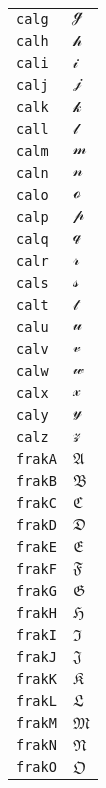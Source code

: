 \begin{longtable}{ll}
\texttt{calg}&${}\mathcal{g}{}$\\
\texttt{calh}&${}\mathcal{h}{}$\\
\texttt{cali}&${}\mathcal{i}{}$\\
\texttt{calj}&${}\mathcal{j}{}$\\
\texttt{calk}&${}\mathcal{k}{}$\\
\texttt{call}&${}\mathcal{l}{}$\\
\texttt{calm}&${}\mathcal{m}{}$\\
\texttt{caln}&${}\mathcal{n}{}$\\
\texttt{calo}&${}\mathcal{o}{}$\\
\texttt{calp}&${}\mathcal{p}{}$\\
\texttt{calq}&${}\mathcal{q}{}$\\
\texttt{calr}&${}\mathcal{r}{}$\\
\texttt{cals}&${}\mathcal{s}{}$\\
\texttt{calt}&${}\mathcal{t}{}$\\
\texttt{calu}&${}\mathcal{u}{}$\\
\texttt{calv}&${}\mathcal{v}{}$\\
\texttt{calw}&${}\mathcal{w}{}$\\
\texttt{calx}&${}\mathcal{x}{}$\\
\texttt{caly}&${}\mathcal{y}{}$\\
\texttt{calz}&${}\mathcal{z}{}$\\
\texttt{frakA}&${}\mathfrak{A} {}$\\
\texttt{frakB}&${}\mathfrak{B} {}$\\
\texttt{frakC}&${}\mathfrak{C} {}$\\
\texttt{frakD}&${}\mathfrak{D} {}$\\
\texttt{frakE}&${}\mathfrak{E} {}$\\
\texttt{frakF}&${}\mathfrak{F} {}$\\
\texttt{frakG}&${}\mathfrak{G} {}$\\
\texttt{frakH}&${}\mathfrak{H} {}$\\
\texttt{frakI}&${}\mathfrak{I} {}$\\
\texttt{frakJ}&${}\mathfrak{J} {}$\\
\texttt{frakK}&${}\mathfrak{K} {}$\\
\texttt{frakL}&${}\mathfrak{L} {}$\\
\texttt{frakM}&${}\mathfrak{M} {}$\\
\texttt{frakN}&${}\mathfrak{N} {}$\\
\texttt{frakO}&${}\mathfrak{O} {}$\\

\end{longtable}
